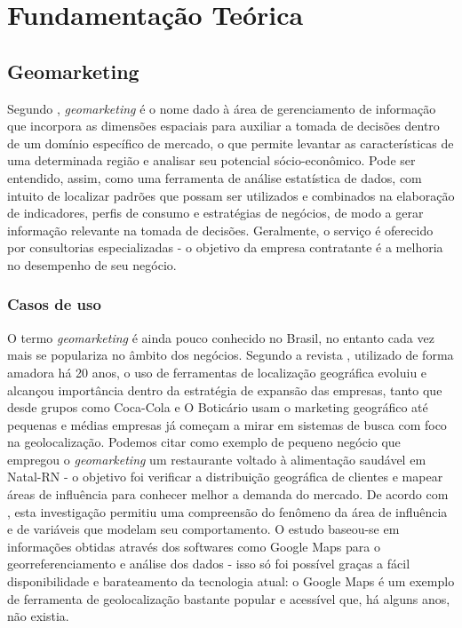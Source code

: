 
\chapter{Fundamentação Teórica}
\label{fundamentacao-teorica}

\section{Geomarketing}
\label{Geom}
Segundo , \emph{geomarketing} é o nome dado à área de
gerenciamento de informação que incorpora as dimensões espaciais para auxiliar a
tomada de decisões dentro de um domínio específico de mercado, o que permite
levantar as características de uma determinada região e analisar seu potencial
sócio-econômico. Pode ser entendido, assim, como uma ferramenta de análise
estatística de dados, com intuito de localizar padrões que possam ser utilizados
e combinados na elaboração de indicadores, perfis de consumo e estratégias de
negócios, de modo a gerar informação relevante na tomada de decisões.
Geralmente, o serviço é oferecido por consultorias especializadas - o  objetivo
da empresa  contratante é a melhoria no desempenho de seu negócio.

\subsection{Casos de uso}
O termo \emph{geomarketing} é ainda pouco conhecido no Brasil, no entanto cada
vez mais se populariza no âmbito dos negócios. Segundo a revista
, utilizado de forma amadora há 20 anos, o uso de ferramentas
de localização geográfica evoluiu e alcançou importância dentro da estratégia de
expansão das empresas, tanto que desde grupos como Coca-Cola e O Boticário usam o marketing
geográfico até pequenas e médias empresas já começam a mirar em sistemas de busca
com foco na geolocalização. Podemos citar como exemplo de pequeno negócio que
empregou o \emph{geomarketing} um restaurante voltado à alimentação saudável em
Natal-RN - o objetivo foi verificar a distribuição geográfica de clientes e
mapear áreas de influência para conhecer melhor a demanda do mercado. De acordo
com , esta investigação permitiu uma compreensão do
fenômeno da área de influência e de variáveis que modelam seu comportamento. O
estudo baseou-se em informações obtidas através dos softwares como Google
Maps para o georreferenciamento e análise dos dados - isso só foi possível
graças a fácil disponibilidade e barateamento da tecnologia atual: o
Google Maps é um exemplo de ferramenta de geolocalização bastante popular
e acessível que, há alguns anos, não existia.

